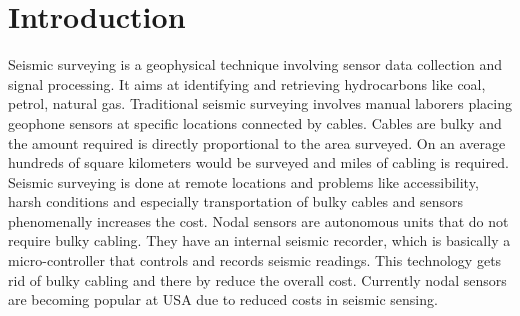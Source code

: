 \section{Introduction}\label{sec:Introduction}
Seismic surveying is a geophysical technique involving sensor data collection and signal processing. It aims at identifying and retrieving hydrocarbons like coal, petrol, natural gas. Traditional seismic surveying involves manual laborers placing geophone sensors at specific locations connected by cables. Cables are bulky and the amount required is directly proportional to the area surveyed. On an average hundreds of square kilometers  would be surveyed and miles of cabling is required. Seismic surveying is done at remote locations and problems like accessibility, harsh  conditions and especially transportation of bulky cables and sensors phenomenally increases the cost. Nodal sensors are autonomous units that do not require bulky cabling. They have an internal seismic recorder, which is basically a micro-controller that controls and records seismic readings. This technology gets rid of bulky cabling and there by reduce the overall cost. Currently nodal sensors are becoming popular at USA due to reduced costs in seismic sensing.

